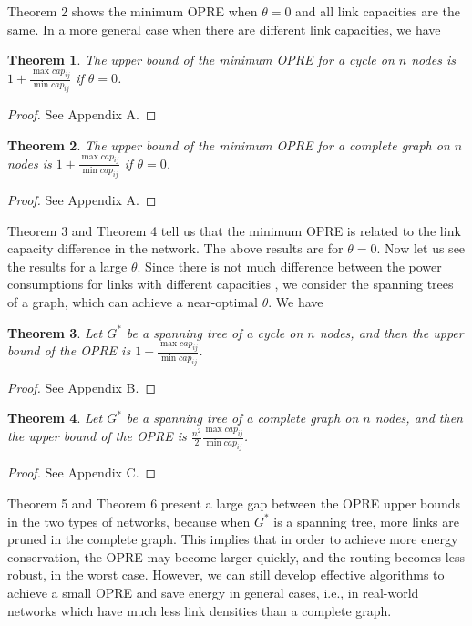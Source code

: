 \documentclass[conference]{IEEEtran}
\newtheorem{theorem}{Theorem}
\begin{document}
Theorem 2 shows the minimum OPRE when $\theta = 0$ and all link capacities are the same. In a more general case when there are different link capacities, we have

\begin{theorem}
The upper bound of the minimum OPRE for a cycle on $n$ nodes is $1 + \frac{\max cap_{ij}}{\min cap_{ij}}$ if $\theta = 0$.
\end{theorem}
\begin{proof}
See Appendix A.
\end{proof}

\begin{theorem}
The upper bound of the minimum OPRE for a complete graph on $n$ nodes is $1 + \frac{\max cap_{ij}}{\min cap_{ij}}$ if $\theta = 0$.
\end{theorem}
\begin{proof}
See Appendix A.
\end{proof}

Theorem 3 and Theorem 4 tell us that the minimum OPRE is related to the link capacity difference in the network. The above results are for $\theta = 0$. Now let us see the results for a large $\theta$. Since there is not much difference between the power consumptions for links with different capacities \cite{}, we consider the spanning trees of a graph, which can achieve a near-optimal $\theta$. We have
\begin{theorem}
Let $G^*$ be a spanning tree of a cycle on $n$ nodes, and then the upper bound of the OPRE is $1 + \frac{\max cap_{ij}}{\min cap_{ij}}$.
\end{theorem}
\begin{proof}
See Appendix B.
\end{proof}
\begin{theorem}
Let $G^*$ be a spanning tree of a complete graph on $n$ nodes, and then the upper bound of the OPRE is $\frac{n^2}{2} \frac{\max cap_{ij}}{\min cap_{ij}}$.
\end{theorem}
\begin{proof}
See Appendix C.
\end{proof}

Theorem 5 and Theorem 6 present a large gap between the OPRE upper bounds in the two types of networks, because when $G^*$ is a spanning tree, more links are pruned in the complete graph. This implies that in order to achieve more energy conservation, the OPRE may become larger quickly, and the routing becomes less robust, in the worst case. However, we can still develop effective algorithms to achieve a small OPRE and save energy in general cases, i.e., in real-world networks which have much less link densities than a complete graph.
\end{document}
